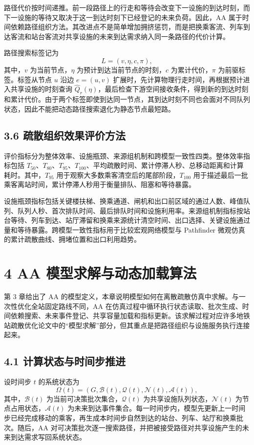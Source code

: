 \documentclass[UTF8,a4paper,12pt]{ctexart}
\begin{document}
路径代价按时间递推。前一段路径上的行走和等待会改变下一设施的到达时刻，而下一设施的等待又取决于这一到达时刻下已经登记的未来负荷。因此，AA 属于时间依赖路径组织方法。其改进点不是简单增加拥挤惩罚，而是把换乘客流、列车到达客流和站台客流对共享设施的未来到达需求纳入同一条路径的代价计算。

路径搜索标签记为
\[
L=(v,\eta,c,\pi),
\]
其中，\(v\) 为当前节点，\(\eta\) 为预计到达当前节点的时刻，\(c\) 为累计代价，\(\pi\) 为前驱标签。标签从节点 \(u\) 沿边 \(e=(u,v)\) 扩展时，先计算物理行走时间，再根据预计进入共享设施的时刻查询 \(\widehat Q_r(\eta)\)，最后检查下游空间接收条件，得到新的到达时刻和累计代价。由于两个标签即使到达同一节点，其到达时刻不同也会面对不同队列状态，因此不能把动态路径搜索退化为静态节点最短路。

\subsection{3.6 疏散组织效果评价方法}

评价指标分为整体效率、设施瓶颈、来源组机制和跨模型一致性四类。整体效率指标包括 \(T_{50}\)、\(T_{80}\)、\(T_{95}\)、\(T_{100}\)、平均疏散时间、累计停滞人秒、总移动距离和计算耗时。其中，\(T_{95}\) 用于观察大多数乘客清空后的尾部阶段，\(T_{100}\) 用于描述最后一批乘客离站时间，累计停滞人秒用于衡量排队、阻塞和等待暴露。

设施瓶颈指标包括关键楼扶梯、换乘通道、闸机和出口前区域的通过人数、峰值队列、队列人秒、首次排队时间、最后排队时间和设施利用率。来源组机制指标按站台等待、列车到达、站厅滞留和换乘来源统计清空时间、出口选择、关键设施通过量和等待暴露。跨模型一致性指标用于比较宏观网络模型与 Pathfinder 微观仿真的累计疏散曲线、拥堵位置和出口利用趋势。

\section{4 AA 模型求解与动态加载算法}

第 3 章给出了 AA 的模型定义，本章说明模型如何在离散疏散仿真中求解。与一次性优化全站固定路线不同，AA 在仿真过程中循环执行状态读取、批次生成、时间依赖搜索、未来事件登记、共享容量加载和指标更新。该求解过程对应许多地铁站疏散优化论文中的“模型求解”部分，但其重点是把路径组织与设施服务执行连接起来。

\subsection{4.1 计算状态与时间步推进}

设时间步 \(t\) 的系统状态为
\[
\Omega(t)=\left(G,\mathcal{B}(t),\mathcal{Q}(t),\mathcal{N}(t),\mathcal{A}(t)\right),
\]
其中，\(\mathcal{B}(t)\) 为当前可决策批次集合，\(\mathcal{Q}(t)\) 为共享设施队列状态，\(\mathcal{N}(t)\) 为节点占用状态，\(\mathcal{A}(t)\) 为未来到达事件集合。每一时间步内，模型先更新上一时间步已经完成移动的乘客，再生成本时间步自然到达的站台、列车、站厅和换乘批次。随后，AA 对可决策批次逐一搜索路径，并把被接受路径对共享设施产生的未来到达需求写回系统状态。
\end{document}
